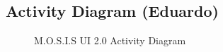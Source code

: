 \newpage
\subsection{Activity Diagram (Eduardo)}
\begin{figure}[H]
  \begin{center}
    
  \end{center}
    \caption{M.O.S.I.S UI 2.0 Activity Diagram}
\end{figure}
